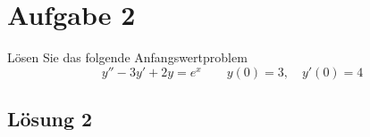 \documentclass[main.tex]{subfiles}
\begin{document}
\section{Aufgabe 2}
Lösen Sie das folgende Anfangswertproblem
\begin{equation*}
    y'' - 3y' + 2y = e^x \qquad y(0)=3, \quad y'(0)=4
\end{equation*}

\subsection{Lösung 2}
\end{document}
